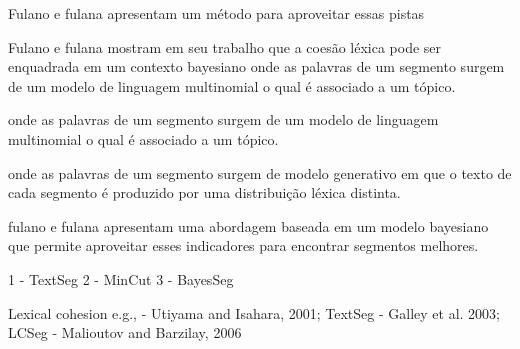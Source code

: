 Fulano e fulana apresentam um método para aproveitar essas pistas





Fulano e fulana mostram em seu trabalho que a coesão léxica pode ser enquadrada em um contexto bayesiano onde as palavras de um segmento surgem de um modelo de linguagem multinomial o qual é associado a um tópico.


onde as palavras de um segmento surgem de um modelo de linguagem multinomial o qual é associado a um tópico.

onde as palavras de um segmento surgem de modelo generativo em que o texto de cada segmento é produzido por uma distribuição léxica distinta. 



















fulano e fulana apresentam uma abordagem baseada em um modelo bayesiano que permite aproveitar esses indicadores para encontrar segmentos melhores.







1 - TextSeg
2 - MinCut
3 - BayesSeg


Lexical cohesion e.g., 
	- Utiyama and Isahara,     2001; {TextSeg}
	- Galley et al.            2003; {LCSeg}
	- Malioutov and Barzilay,  2006  {}





